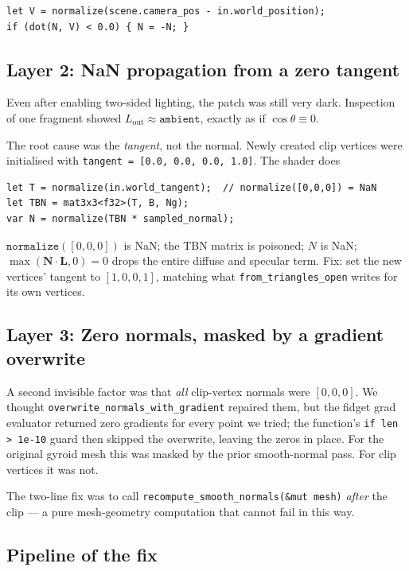 \documentclass[11pt]{article}
\begin{document}
\begin{lstlisting}[language=wgsl]
let V = normalize(scene.camera_pos - in.world_position);
if (dot(N, V) < 0.0) { N = -N; }
\end{lstlisting}

\subsection{Layer 2: NaN propagation from a zero tangent}

Even after enabling two-sided lighting, the patch was still very dark.
Inspection of one fragment showed
$L_\text{out} \approx \texttt{ambient}$, exactly as if
$\cos\theta\equiv 0$.

The root cause was the \emph{tangent}, not the normal.  Newly created
clip vertices were initialised with
\texttt{tangent = [0.0, 0.0, 0.0, 1.0]}.  The shader does

\begin{lstlisting}[language=wgsl]
let T = normalize(in.world_tangent);  // normalize([0,0,0]) = NaN
let TBN = mat3x3<f32>(T, B, Ng);
var N = normalize(TBN * sampled_normal);
\end{lstlisting}

\(\texttt{normalize}([0,0,0])\) is NaN; the TBN matrix is poisoned;
\(N\) is NaN; \(\max(\mathbf{N}\cdot\mathbf{L},0)=0\) drops the entire
diffuse and specular term.  Fix: set the new vertices' tangent to
\([1,0,0,1]\), matching what \texttt{from\_triangles\_open} writes for
its own vertices.

\subsection{Layer 3: Zero normals, masked by a gradient overwrite}

A second invisible factor was that \emph{all} clip-vertex normals were
$[0,0,0]$.  We thought
\texttt{overwrite\_normals\_with\_gradient} repaired them, but the
fidget grad evaluator returned zero gradients for every point we
tried; the function's
\texttt{if len > 1e-10} guard then skipped the overwrite, leaving the
zeros in place.  For the original gyroid mesh this was masked by the
prior smooth-normal pass.  For clip vertices it was not.

The two-line fix was to call \texttt{recompute\_smooth\_normals(\&mut
mesh)} \emph{after} the clip --- a pure mesh-geometry computation that
cannot fail in this way.

\subsection{Pipeline of the fix}
\end{document}
